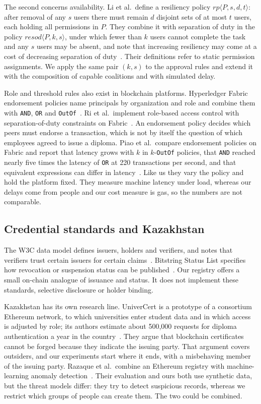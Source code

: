 The second concerns availability. Li et al.\ define a resiliency policy $rp\langle P,s,d,t\rangle$: after removal of any $s$ users there must remain $d$ disjoint sets of at most $t$ users, each holding all permissions in $P$. They combine it with separation of duty in the policy $resod\langle P,k,s\rangle$, under which fewer than $k$ users cannot complete the task and any $s$ users may be absent, and note that increasing resiliency may come at a cost of decreasing separation of duty~\cite{li2009}. Their definitions refer to static permission assignments. We apply the same pair $(k,s)$ to the approval rules and extend it with the composition of capable coalitions and with simulated delay.

Role and threshold rules also exist in blockchain platforms. Hyperledger Fabric endorsement policies name principals by organization and role and combine them with \texttt{AND}, \texttt{OR} and \texttt{OutOf}~\cite{fabricdocs}. Ri et al.\ implement role-based access control with separation-of-duty constraints on Fabric~\cite{ri2022}. An endorsement policy decides which peers must endorse a transaction, which is not by itself the question of which employees agreed to issue a diploma. Piao et al.\ compare endorsement policies on Fabric and report that latency grows with $k$ in $k$-\texttt{OutOf} policies, that \texttt{AND} reached nearly five times the latency of \texttt{OR} at 220 transactions per second, and that equivalent expressions can differ in latency~\cite{piao2023}. Like us they vary the policy and hold the platform fixed. They measure machine latency under load, whereas our delays come from people and our cost measure is gas, so the numbers are not comparable.

\subsection{Credential standards and Kazakhstan}
The W3C data model defines issuers, holders and verifiers, and notes that verifiers trust certain issuers for certain claims~\cite{w3cvcdm}. Bitstring Status List specifies how revocation or suspension status can be published~\cite{w3cbitstring}. Our registry offers a small on-chain analogue of issuance and status. It does not implement these standards, selective disclosure or holder binding.

Kazakhstan has its own research line. UniverCert is a prototype of a consortium Ethereum network, to which universities enter student data and in which access is adjusted by role; its authors estimate about 500,000 requests for diploma authentication a year in the country~\cite{shakan2021}. They argue that blockchain certificates cannot be forged because they indicate the issuing party. That argument covers outsiders, and our experiments start where it ends, with a misbehaving member of the issuing party. Razaque et al.\ combine an Ethereum registry with machine-learning anomaly detection~\cite{razaque2025}. Their evaluation and ours both use synthetic data, but the threat models differ: they try to detect suspicious records, whereas we restrict which groups of people can create them. The two could be combined.
